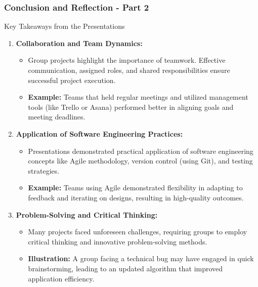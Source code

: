 \documentclass{beamer}
\begin{document}
\begin{frame}[fragile]
    \frametitle{Conclusion and Reflection - Part 2}
    \begin{block}{Key Takeaways from the Presentations}
        \begin{enumerate}
            \item \textbf{Collaboration and Team Dynamics:}
            \begin{itemize}
                \item Group projects highlight the importance of teamwork. Effective communication, assigned roles, and shared responsibilities ensure successful project execution.
                \item \textbf{Example:} Teams that held regular meetings and utilized management tools (like Trello or Asana) performed better in aligning goals and meeting deadlines.
            \end{itemize}

            \item \textbf{Application of Software Engineering Practices:}
            \begin{itemize}
                \item Presentations demonstrated practical application of software engineering concepts like Agile methodology, version control (using Git), and testing strategies.
                \item \textbf{Example:} Teams using Agile demonstrated flexibility in adapting to feedback and iterating on designs, resulting in high-quality outcomes.
            \end{itemize}

            \item \textbf{Problem-Solving and Critical Thinking:}
            \begin{itemize}
                \item Many projects faced unforeseen challenges, requiring groups to employ critical thinking and innovative problem-solving methods.
                \item \textbf{Illustration:} A group facing a technical bug may have engaged in quick brainstorming, leading to an updated algorithm that improved application efficiency.
            \end{itemize}
        \end{enumerate}
    \end{block}
\end{frame}
\end{document}
